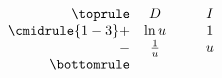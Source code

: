 \begin{equation*}
  \begin{array}{r c @{\hspace*{1.0cm}} c}\toprule
      & D & I \\\cmidrule{1-3}
      + & \ln u & 1 \\
      - & \tfrac1{u} & u \\\bottomrule
  \end{array}
\end{equation*}